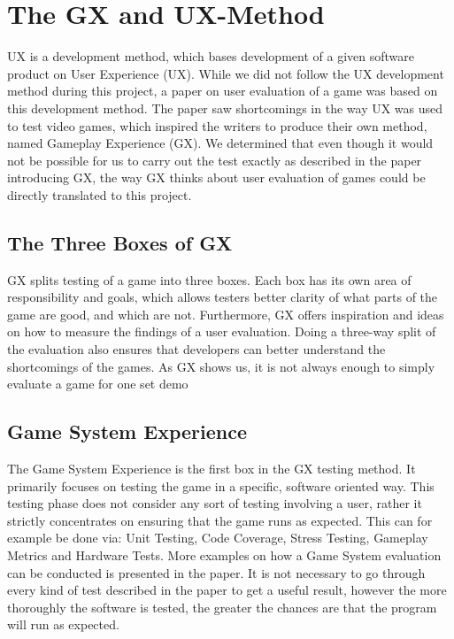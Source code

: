 \section{The GX and UX-Method}
\label{sec:gx_ux_method}
UX is a development method, which bases development of a given software product on User Experience (UX).
While we did not follow the UX development method during this project, a paper on user evaluation of a game was based on this development method.
The paper saw shortcomings in the way UX was used to test video games, which inspired the writers to produce their own method, named Gameplay Experience (GX).
We determined that even though it would not be possible for us to carry out the test exactly as described in the paper introducing GX, the way GX thinks about user evaluation of games could be directly translated to this project\cite{gxmethod}.

\subsection{The Three Boxes of GX}
GX splits testing of a game into three boxes.
Each box has its own area of responsibility and goals, which allows testers better clarity of what parts of the game are good, and which are not.
Furthermore, GX offers inspiration and ideas on how to measure the findings of a user evaluation.
Doing a three-way split of the evaluation also ensures that developers can better understand the shortcomings of the games.
As GX shows us, it is not always enough to simply evaluate a game for one set demo

\subsection{Game System Experience}
The Game System Experience is the first box in the GX testing method.
It primarily focuses on testing the game in a specific, software oriented way.
This testing phase does not consider any sort of testing involving a user, rather it strictly concentrates on ensuring that the game runs as expected.
This can for example be done via: Unit Testing, Code Coverage, Stress Testing, Gameplay Metrics and Hardware Tests.
More examples on how a Game System evaluation can be conducted is presented in the paper\cite{gxmethod}.
It is not necessary to go through every kind of test described in the paper to get a useful result, however the more thoroughly the software is tested, the greater the chances are that the program will run as expected.

